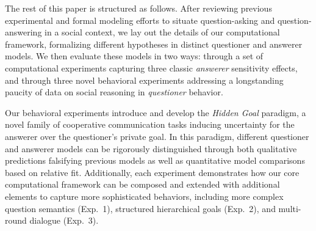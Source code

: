 \documentclass[12pt, floatsintext, jou]{apa6}
\begin{document}
%




%

The rest of this paper is structured as follows. 
After reviewing previous experimental and formal modeling efforts to situate question-asking and question-answering in a social context, we lay out the details of our computational framework, formalizing different hypotheses in distinct questioner and answerer models. 
We then evaluate these models in two ways: through a set of computational experiments capturing three classic \emph{answerer} sensitivity effects, and through three novel behavioral experiments addressing a longstanding paucity of data on social reasoning in \emph{questioner} behavior. 

Our behavioral experiments introduce and develop the \emph{Hidden Goal} paradigm, a novel family of cooperative communication tasks inducing uncertainty for the answerer over the questioner's private goal. 
In this paradigm, different questioner and answerer models can be rigorously distinguished through both qualitative predictions falsifying previous models as well as quantitative model comparisons based on relative fit. 
Additionally, each experiment demonstrates how our core computational framework can be composed and extended with additional elements to capture more sophisticated behaviors, including more complex question semantics (Exp.~1), structured hierarchical goals (Exp.~2), and multi-round dialogue (Exp.~3). 
\end{document}
